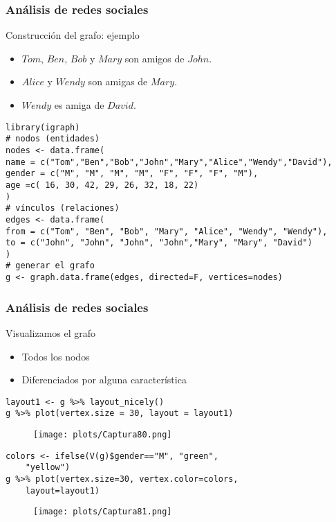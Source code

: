 \documentclass[11pt]{beamer}
\begin{document}

\begin{frame}[fragile]
\frametitle{Análisis de redes sociales} 
Construcción del grafo: ejemplo
\begin{itemize}
    \item  $Tom$, $Ben$, $Bob$ y $Mary$ son amigos de $John$.
\item $Alice$ y $Wendy$ son amigas de $Mary$.
\item $Wendy$ es amiga de $David$.
\end{itemize}
\begin{verbatim}
library(igraph)
# nodos (entidades)
nodes <- data.frame(
name = c("Tom","Ben","Bob","John","Mary","Alice","Wendy","David"),
gender = c("M", "M", "M", "M", "F", "F", "F", "M"),
age =c( 16, 30, 42, 29, 26, 32, 18, 22)
)
# vínculos (relaciones)
edges <- data.frame(
from = c("Tom", "Ben", "Bob", "Mary", "Alice", "Wendy", "Wendy"),
to = c("John", "John", "John", "John","Mary", "Mary", "David")
)
# generar el grafo
g <- graph.data.frame(edges, directed=F, vertices=nodes)    
\end{verbatim}
\end{frame}


\begin{frame}[fragile]
\frametitle{Análisis de redes sociales} 
Visualizamos el grafo
\begin{itemize}
    \item Todos los nodos
    \item Diferenciados por alguna característica
\end{itemize}
\begin{multicols}{2}
\begin{verbatim}
layout1 <- g %>% layout_nicely() 
g %>% plot(vertex.size = 30, layout = layout1)
\end{verbatim}
\begin{figure}
    \centering
        \texttt{[image: plots/Captura80.png]}
       \end{figure}
\begin{verbatim}
colors <- ifelse(V(g)$gender=="M", "green", 
    "yellow")
g %>% plot(vertex.size=30, vertex.color=colors, 
    layout=layout1)
\end{verbatim}
\begin{figure}
    \centering
        \texttt{[image: plots/Captura81.png]}
       \end{figure}
\end{multicols}
       
\end{frame}
\end{document}
